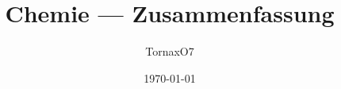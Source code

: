 \documentclass[a4paper, 12pt]{scrartcl}
\title{Chemie --- Zusammenfassung}
\author{TornaxO7}
\date{\today}
\begin{document}
    \schemestop
\end{document}
